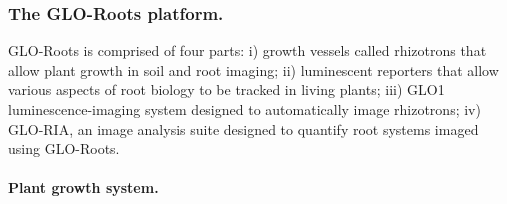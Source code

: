 \documentclass[]{article}
\begin{document}
\subsubsection{The GLO-Roots platform.}\label{the-glo-roots-platform.}

GLO-Roots is comprised of four parts: i) growth vessels called
rhizotrons that allow plant growth in soil and root imaging; ii)
luminescent reporters that allow various aspects of root biology to be
tracked in living plants; iii) GLO1 luminescence-imaging system designed
to automatically image rhizotrons; iv) GLO-RIA, an image analysis suite
designed to quantify root systems imaged using GLO-Roots.

\paragraph{Plant growth system.}\label{plant-growth-system.}
\end{document}
